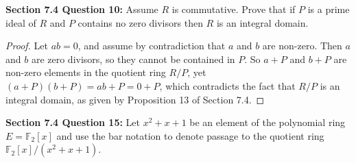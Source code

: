 \documentclass{article}
\begin{document}
\textbf{Section 7.4 Question 10:} Assume $R$ is commutative. Prove that if
  $P$ is a prime ideal of $R$ and $P$ contains no zero divisors then $R$ is
  an integral domain.

  \begin{proof}
    Let $ab=0$, and assume by contradiction that $a$ and $b$ are non-zero.
    Then $a$ and $b$ are zero divisors, so they cannot be contained in $P$.
    So $a+P$ and $b+P$ are non-zero elements in the quotient ring $R/P$,
    yet $(a+P)(b+P)=ab+P=0+P$, which contradicts the fact that $R/P$ is an
    integral domain, as given by Proposition 13 of Section 7.4.
  \end{proof}

\textbf{Section 7.4 Question 15:} Let $x^2+x+1$ be an element of the
  polynomial ring $E=\mathbb{F}_2[x]$ and use the bar notation to denote
  passage to the quotient ring $\mathbb{F}_2[x]/(x^2+x+1)$.
\end{document}
